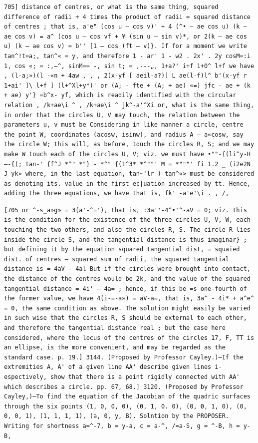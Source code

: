 \documentclass[12pt]{article}
\theoremstyle{plain}
\begin{document}
\newpage
\setcounter{page}{567}
\begin{verbatim}
705] distance of centres, or what is the same thing, squared difference of radii + 4 times the product of radii = squared distance of centres ; that is, a'e" (cos u — cos v)' + 4 (^• — ae cos u) (k — ae cos v) = a^ (cos u — cos vf + ¥ (sin u — sin v)*, or 2(k — ae cos u) (k — ae cos v) = b'' [1 — cos (ft — v)}. If for a moment we write tan^!t=a;, tan^« = y, and therefore 1 - ar' 1 - w2 . 2x' . 2y cosM=:i 1, cos «; = :,—^, sinM== -, sin t; = ,---„, 1+a?' i+f 1+0^ l+f we have , (l-a;»)(l -«n + 4aw , , , 2(x-yf [ aeil-a?)] L ae(l-f)l^ b'(x-yf r 1+ai' ]\ l+f ] (l+^Xl+y*)' or (A; - fte + (A; + ae) «=) jfc - ae + (k + ae) y'} =b^x- yf, which is readily identified with the circular relation , /k+ae\i ^ , /k+ae\i ^ jk^-a'^Xi or, what is the same thing, in order that the circles U, V may touch, the relation between the parameters u, v must be Considering in like manner a circle, centre the point W, coordinates (acosw, isinw), and radius A — a«cosw, say the circle W; this will, as before, touch the circles R, S; and we may make W touch each of the circles U, V; viz. we must have •""-{(li^y-H—-{(; tan-' {f^J *^" *"} - *^" {(1^3* *^""' M = *"""' fi 1.2 _ (i2e2N J yk» where, in the last equation, tan~'lr ) tan^«> must be considered as denoting its. value in the first ec|uation increased by tt. Hence, adding the three equations, we have that is, fk' -a'e'\i . , /, 
\end{verbatim}

\newpage
\setcounter{page}{568}
\begin{verbatim}
[705 or ^-s_a»g» = 3(a'-^='), that is, :3a''-4^•'^-aV = 0; viz. this is the condition for the existence of the three circles U, V, W, each touching the two others, and also the circles R, S. The circle R lies inside the circle S, and the tangential distance is thus imaginar}-; but defining it by the equation squared tangential dist, = squaied dist. of centres — squared sum of radii, the squared tangential distance is = 4aV - 4al But if the circles were brought into contact, the distance of the centres would be 2k, and the value of the squared tangential distance = 4i' — 4a= ; hence, if this be =s one-fourth of the former value, we have 4(i-=-a») = aV-a=, that is, 3a^ - 4i* + a^e^ = 0, the same condition as above. The solution might easily be varied in such wise that the circles R, S should be external to each other, and therefore the tangential distance real ; but the case here considered, where the locus of the centres of the circles 17, F, TT is an ellipse, is the more convenient, and may be regarded as the standard case. p. 19.] 3144. (Proposed by Professor Cayley.)—If the extremities A, A' of a given line AA' describe given lines i-espectively, show that there is a point rigidly connected with AA' which describes a circle. pp. 67, 68.] 3120. (Proposed by Professor Cayley,)—To find the equation of the Jacobian of the quadric surfaces through the six points (1, 0, 0, 0), (0, 1, 0. 0), (0, 0, 1, 0), (0, 0, 0, 1), (1, 1, 1, 1), (a, 0, y, B). Solntion by the PROPOSER. Writing for shortness a=^-7, b = y-a, c = a-^, /=a-S, g = ^-B, h = y-B, 
\end{verbatim}
\end{document}
